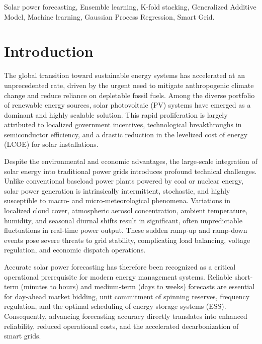 \documentclass[conference]{IEEEtran}
\begin{document}
\begin{IEEEkeywords}
Solar power forecasting, Ensemble learning, K-fold stacking, Generalized Additive Model, Machine learning, Gaussian Process Regression, Smart Grid.
\end{IEEEkeywords}


\section{Introduction}

The global transition toward sustainable energy systems has accelerated at an unprecedented rate, driven by the urgent need to mitigate anthropogenic climate change and reduce reliance on depletable fossil fuels. Among the diverse portfolio of renewable energy sources, solar photovoltaic (PV) systems have emerged as a dominant and highly scalable solution. This rapid proliferation is largely attributed to localized government incentives, technological breakthroughs in semiconductor efficiency, and a drastic reduction in the levelized cost of energy (LCOE) for solar installations.

Despite the environmental and economic advantages, the large-scale integration of solar energy into traditional power grids introduces profound technical challenges. Unlike conventional baseload power plants powered by coal or nuclear energy, solar power generation is intrinsically intermittent, stochastic, and highly susceptible to macro- and micro-meteorological phenomena. Variations in localized cloud cover, atmospheric aerosol concentration, ambient temperature, humidity, and seasonal diurnal shifts result in significant, often unpredictable fluctuations in real-time power output. These sudden ramp-up and ramp-down events pose severe threats to grid stability, complicating load balancing, voltage regulation, and economic dispatch operations.

Accurate solar power forecasting has therefore been recognized as a critical operational prerequisite for modern energy management systems. Reliable short-term (minutes to hours) and medium-term (days to weeks) forecasts are essential for day-ahead market bidding, unit commitment of spinning reserves, frequency regulation, and the optimal scheduling of energy storage systems (ESS). Consequently, advancing forecasting accuracy directly translates into enhanced reliability, reduced operational costs, and the accelerated decarbonization of smart grids.
\end{document}
